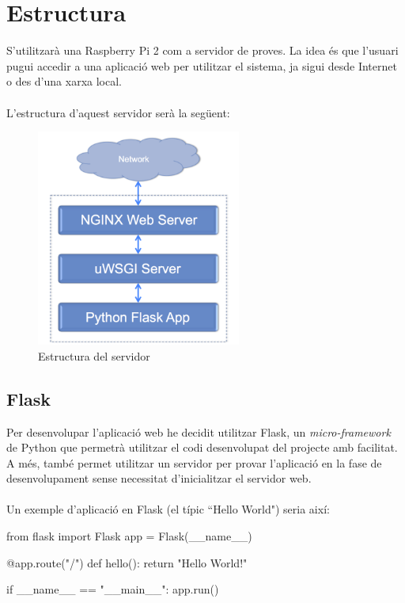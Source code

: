 \label{sec:Servidor}

\section{Estructura}
	S'utilitzarà una Raspberry Pi 2 com a servidor de proves. La idea és que l'usuari pugui accedir a una aplicació web per utilitzar el sistema, ja sigui desde Internet o des d'una xarxa local.\\\\
	L'estructura d'aquest servidor serà la següent:\\
	\begin{figure}[H]
			\centering
			\includegraphics[width=0.6\textwidth]{images/server}
			\caption[Estructura del servidor]{Estructura del servidor\protect\footnotemark}
	\end{figure}
	\subsection{Flask}
		Per desenvolupar l'aplicació web he decidit utilitzar Flask\cite{Flask}, un \textit{micro-framework} de Python que permetrà utilitzar el codi desenvolupat del projecte amb facilitat.
		A més, també permet utilitzar un servidor per provar l'aplicació en la fase de desenvolupament sense necessitat d'inicialitzar el servidor web.\\\\
		Un exemple d'aplicació en Flask (el típic ``Hello World") seria així:\\
		\begin{python}
from flask import Flask
app = Flask(__name__)

@app.route("/")
def hello():
	return "Hello World!"

if __name__ == "__main__":
	app.run()
		\end{python}
